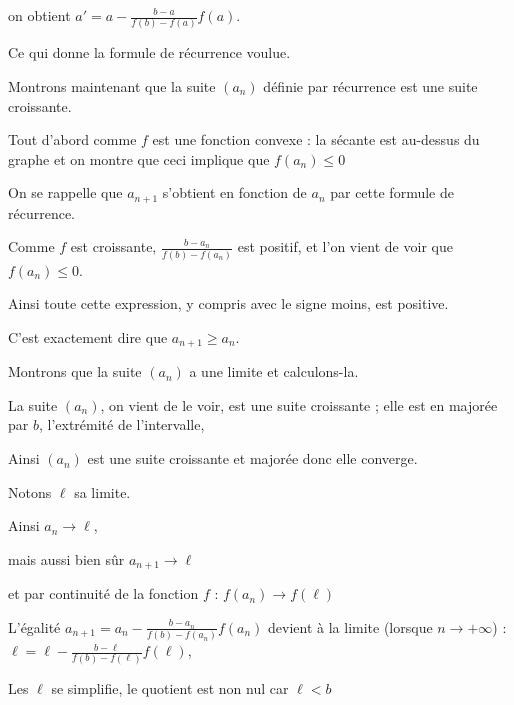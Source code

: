 on obtient $a'=a - \frac{b-a}{f(b)-f(a)}f(a)$.

Ce qui donne la formule de récurrence voulue.
  




\diapo

Montrons maintenant que la suite $(a_n)$ définie par récurrence est une suite croissante.

\change

Tout d'abord comme $f$ est une fonction convexe : la sécante 
est au-dessus du graphe et on montre que ceci implique que $f(a_n) \le 0$

\change

On se rappelle que $a_{n+1}$ s'obtient en fonction de $a_n$ par cette formule de récurrence.

  Comme $f$ est croissante, $\frac{b-a_n}{f(b)-f(a_n)}$ est positif, et
  l'on vient de voir que $f(a_n) \le 0$.
  
  Ainsi toute cette expression, y compris avec le signe moins, est positive.

\change
  
  C'est exactement dire que $a_{n+1} \ge a_n$.
  
\change

Montrons que la suite $(a_n)$ a une limite et calculons-la.

\change

  La suite $(a_n)$, on vient de le voir, est une suite croissante ; elle est en majorée par $b$, 
  l’extrémité de l'intervalle, 
  
  Ainsi $(a_n)$ est une suite croissante et majorée donc elle converge. 
  
\change

  Notons $\ell$ sa limite. 
  

\change

Ainsi $a_n \to \ell$,

mais aussi bien sûr $a_{n+1} \to \ell$

et par continuité de la fonction $f$ : $f(a_n)\to f(\ell)$

\change

  L'égalité $a_{n+1} = a_n - \frac{b-a_n}{f(b)-f(a_n)}f(a_n)$ devient à la limite (lorsque $n\to+\infty$) :
  $\ell = \ell - \frac{b-\ell}{f(b)-f(\ell)} f(\ell)$, 
  
  
\change

Les $\ell$ se simplifie, le quotient est non nul car $\ell < b$

